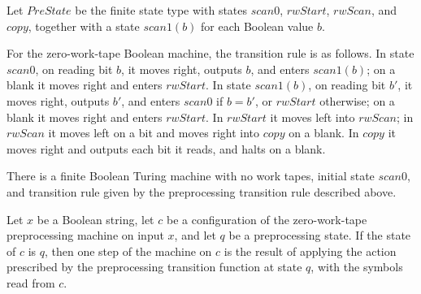 \begin{definition}
\label{Complexity.TimeHierarchy.PreState}
\leanok
Let $PreState$ be the finite state type with states $scan0$, $rwStart$, $rwScan$, and
$copy$, together with a state $scan1(b)$ for each Boolean value $b$.
\end{definition}

\begin{definition}
\label{Complexity.TimeHierarchy.preTr}
\leanok
{}
For the zero-work-tape Boolean machine, the transition rule is as follows. In state
$scan0$, on reading bit $b$, it moves right, outputs $b$, and enters $scan1(b)$; on a
blank it moves right and enters $rwStart$. In state $scan1(b)$, on reading bit $b'$, it
moves right, outputs $b'$, and enters $scan0$ if $b=b'$, or $rwStart$ otherwise; on a
blank it moves right and enters $rwStart$. In $rwStart$ it moves left into $rwScan$; in
$rwScan$ it moves left on a bit and moves right into $copy$ on a blank. In $copy$ it
moves right and outputs each bit it reads, and halts on a blank.
\end{definition}

\begin{definition}
\label{Complexity.TimeHierarchy.preTM}
\leanok
{}
There is a finite Boolean Turing machine with no work tapes, initial state $scan0$, and
transition rule given by the preprocessing transition rule described above.
\end{definition}

\begin{lemma}
\label{Complexity.TimeHierarchy.preTM_step}
\leanok
{}
Let $x$ be a Boolean string, let $c$ be a configuration of the zero-work-tape
preprocessing machine on input $x$, and let $q$ be a preprocessing state. If the state
of $c$ is $q$, then one step of the machine on $c$ is the result of applying the action
prescribed by the preprocessing transition function at state $q$, with the symbols read
from $c$.
\end{lemma}

